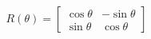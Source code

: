 \documentclass[preview]{standalone}
\begin{document}
\begin{align*}
R(\theta)=\begin{bmatrix}\cos\theta&-\sin\theta\\\sin\theta&\cos\theta\end{bmatrix}
\end{align*}
\end{document}

